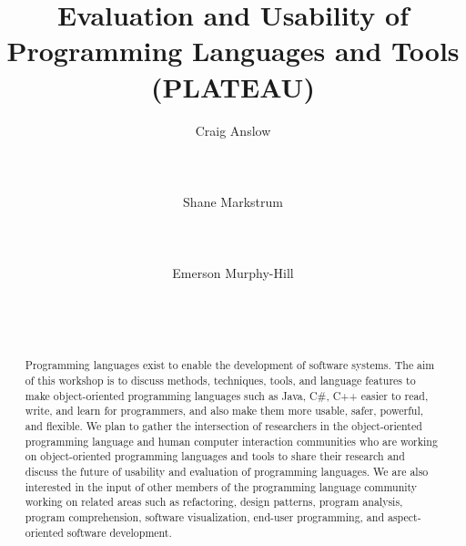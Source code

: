 \documentclass{acm_proc_article-sp}
\begin{document}
\title{Evaluation and Usability of Programming Languages and Tools (PLATEAU)}

\author{
\alignauthor Craig Anslow\\
       \\
       \\
       \\
\alignauthor Shane Markstrum\\
       \\
       \\
       \\
\alignauthor Emerson Murphy-Hill\\
       \\
       \\
       \\
       }

\date{}

\maketitle
\begin{abstract}

Programming languages exist to enable the development of software systems. The aim of this workshop is to discuss methods, techniques, tools, and language features to make object-oriented programming languages such as Java, C\#, C++ easier to read, write, and learn for programmers, and also make them more usable, safer, powerful, and flexible. We plan to gather the intersection of researchers in the object-oriented programming language and human computer interaction communities who are working on object-oriented programming languages and tools to share their research and discuss the future of usability and evaluation of programming languages. We are also interested in the input of other members of the programming language community working on related areas such as refactoring, design patterns, program analysis, program comprehension, software visualization, end-user programming, and aspect-oriented software development.

\end{abstract}
\end{document}
